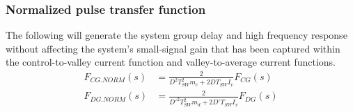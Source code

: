 \documentclass{scrartcl}
\begin{document}
		\subsubsection{Normalized pulse transfer function}
		The following will generate the system group delay and high frequency response without affecting the system's small-signal gain that has been captured within the control-to-valley current function and valley-to-average current functions. 
		\begin{align}
		F_{CG.NORM}(s) &= \frac{2}{D^2 T_{SW}^2m_c + 2D T_{SW} I_v} F_{CG}(s)\label{FCG_NORM} \\
		F_{DG.NORM}(s) &= \frac{2}{D'^2 T_{SW}^2m_d + 2D' T_{SW} I_v}F_{DG}(s) \label{lim_FDG}
		\end{align}

	
\end{document}
